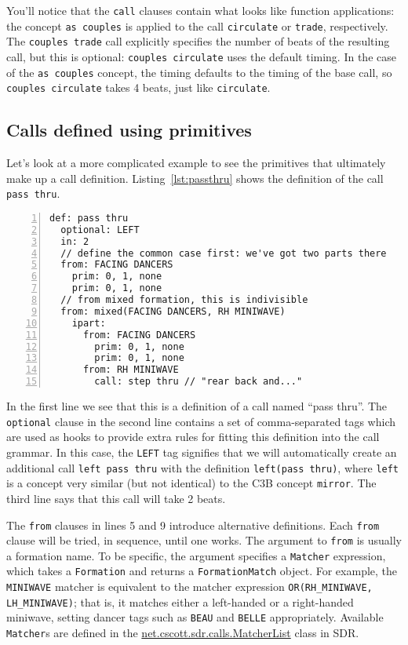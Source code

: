 \documentclass[12pt]{article}
\newcommand{\clause}[1]{\texttt{#1}}
\renewcommand{\call}[1]{\texttt{#1}} %
\newcommand{\package}[1]{\url{#1}}
\begin{document}
You'll notice that the \clause{call} clauses contain what looks like
function applications: the concept \call{as couples} is applied to
the call \call{circulate} or \call{trade}, respectively.  The
\call{couples trade} call explicitly specifies the number of beats of
the resulting call, but this is optional: \call{couples circulate}
uses the default timing.  In the case of the \call{as couples}
concept, the timing defaults to the timing of the base call, so
\call{couples circulate} takes 4 beats, just like \call{circulate}.

\subsection{Calls defined using primitives}
Let's look at a more complicated example to see the primitives that
ultimately make up a call definition.  Listing~\ref{lst:passthru}
shows the definition of the call \call{pass thru}.

\begin{lstlisting}[numbers=left,float,caption=A definition with primitives.,label=lst:passthru]
def: pass thru
  optional: LEFT
  in: 2
  // define the common case first: we've got two parts there
  from: FACING DANCERS
    prim: 0, 1, none
    prim: 0, 1, none
  // from mixed formation, this is indivisible
  from: mixed(FACING DANCERS, RH MINIWAVE)
    ipart:
      from: FACING DANCERS
        prim: 0, 1, none
        prim: 0, 1, none
      from: RH MINIWAVE
        call: step thru // "rear back and..."
\end{lstlisting}

In the first line we see that this is a definition of a call named
``pass thru''.  The \clause{optional} clause in the second line
contains a set of comma-separated tags which are used as hooks to
provide extra rules for fitting this definition into the call grammar.
In this case, the \texttt{LEFT} tag signifies that we will
automatically create an additional call \call{left pass thru} with
the definition \texttt{left(pass thru)}, where \call{left} is a
concept very similar (but not identical) to the C3B concept
\call{mirror}.  The third line says that this call will take 2 beats.

The \clause{from} clauses in lines 5 and 9 introduce alternative
definitions.  Each \clause{from} clause will be tried, in sequence,
until one works.  The argument to \clause{from} is usually a formation
name.  To be specific, the argument specifies a \texttt{Matcher}
expression, which takes a \texttt{Formation} and returns a
\texttt{FormationMatch} object.  For example, the \texttt{MINIWAVE}
matcher is equivalent to the matcher expression \texttt{OR(RH\_MINIWAVE,
  LH\_MINIWAVE)}; that is, it matches either a left-handed or a
right-handed miniwave, setting dancer tags such as \texttt{BEAU} and
\texttt{BELLE} appropriately.  Available \texttt{Matcher}s are defined
in the \package{net.cscott.sdr.calls.MatcherList} class in SDR.
\end{document}

